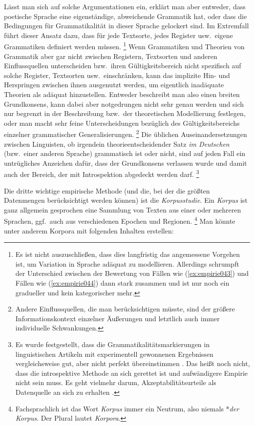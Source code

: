 Lässt man sich auf solche Argumentationen ein, erklärt man aber entweder, dass poetische Sprache eine eigenständige, abweichende Grammatik hat, oder dass die Bedingungen für Grammatikalität in dieser Sprache gelockert sind.
Im Extremfall führt dieser Ansatz dazu, dass für jede Textsorte, jedes Register usw.\ eigene Grammatiken definiert werden müssen.%
\footnote{Es ist nicht auszuschließen, dass dies langfristig das angemessene Vorgehen ist, um Variation in Sprache adäquat zu modellieren.
Allerdings schrumpft der Unterschied zwischen der Bewertung von Fällen wie (\ref{ex:empirie043}) und Fällen wie (\ref{ex:empirie044}) dann stark zusammen und ist nur noch ein gradueller und kein kategorischer mehr.}
Wenn Grammatiken und Theorien von Grammatik aber gar nicht zwischen Registern, Textsorten und anderen Einflussquellen unterscheiden bzw.\ ihren Gültigkeitsbereich nicht spezifisch auf solche Register, Textsorten usw.\ einschränken, kann das implizite Hin- und Herspringen zwischen ihnen ausgenutzt werden, um eigentlich inadäquate Theorien als adäquat hinzustellen.
Entweder beschreibt man also einen breiten Grundkonsens, kann dabei aber notgedrungen nicht sehr genau werden und sich nur begrenzt in der Beschreibung bzw.\ der theoretischen Modellierung festlegen, oder man macht sehr feine Unterscheidungen bezüglich des Gültigkeitsbereichs einzelner grammatischer Generalisierungen.%
\footnote{Andere Einflussquellen, die man berücksichtigen müsste, sind \zB der größere Informationskontext einzelner Äußerungen und letztlich auch immer individuelle Schwankungen.}
Die üblichen Auseinandersetzungen zwischen Linguisten, ob irgendein theorieentscheidender Satz \textit{im Deutschen} (bzw.\ einer anderen Sprache) grammatisch ist oder nicht, sind auf jeden Fall ein untrügliches Anzeichen dafür, dass der Grundkonsens verlassen wurde und damit auch der Bereich, der mit Introspektion abgedeckt werden darf.%
\footnote{Es wurde festgestellt, dass die Grammatikalitätsmarkierungen in linguistischen Artikeln mit experimentell gewonnenen Ergebnissen vergleichsweise gut, aber nicht perfekt übereinstimmen \citep{SprouseEa2013}.
Das heißt noch nicht, dass die introspektive Methode an sich gerettet ist und aufwändigere Empirie nicht sein muss.
Es geht vielmehr darum, Akzeptabilitätsurteile als Datenquelle an sich zu erhalten \citep{SchuetzeSprouse2014}.}

Die dritte wichtige empirische Methode (und die, bei der die größten Datenmengen berücksichtigt werden können) ist die \textit{Korpusstudie}.
Ein \textit{Korpus} ist ganz allgemein gesprochen eine Sammlung von Texten aus einer oder mehreren Sprachen, ggf.\ auch aus verschiedenen Epochen und Regionen.%
\footnote{Fachsprachlich ist das Wort \textit{Korpus} immer ein Neutrum, also niemals *\textit{der Korpus}.
Der Plural lautet \textit{Korpora}.}
Man könnte unter anderem Korpora mit folgenden Inhalten erstellen:

